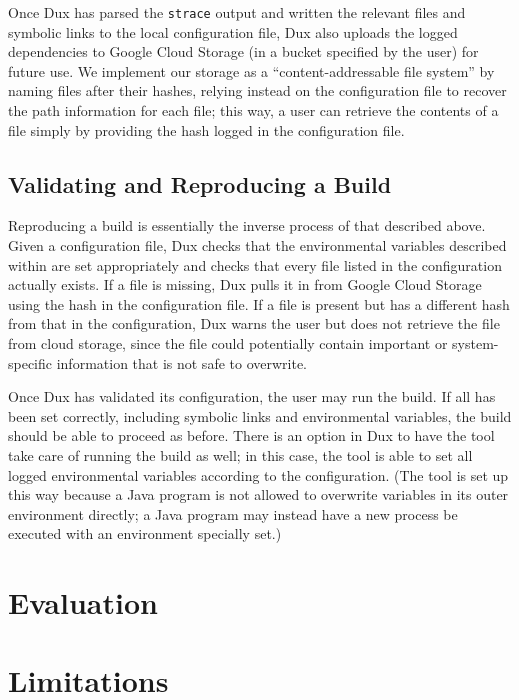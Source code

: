 \documentclass[10pt,conference]{IEEEtran}
\begin{document}
Once Dux has parsed the \texttt{strace} output and written the relevant files and symbolic links to
the local configuration file, Dux also uploads the logged dependencies to Google Cloud Storage (in a
bucket specified by the user) for future use. We implement our storage as a ``content-addressable
file system'' by naming files after their hashes, relying instead on the configuration file to recover
the path information for each file; this way, a user can retrieve the contents of a file simply by 
providing the hash logged in the configuration file.

\subsection{Validating and Reproducing a Build}
Reproducing a build is essentially the inverse process of that described above. Given a configuration file,
Dux checks that the environmental variables described within are set appropriately and checks that every
file listed in the configuration actually exists. If a file is missing, Dux pulls it in from Google Cloud
Storage using the hash in the configuration file. If a file is present but has a different hash from that
in the configuration, Dux warns the user but does not retrieve the file from cloud storage, since the file
could potentially contain important or system-specific information that is not safe to overwrite.

Once Dux has validated its configuration, the user may run the build. If all has been set correctly, including
symbolic links and environmental variables, the build should be able to proceed as before. There is an option
in Dux to have the tool take care of running the build as well; in this case, the tool is able to set all
logged environmental variables according to the configuration. (The tool is set up this way because a Java program
is not allowed to overwrite variables in its outer environment directly; a Java program may instead have a new
process be executed with an environment specially set.)

\section{Evaluation}

\section{Limitations}
\end{document}
